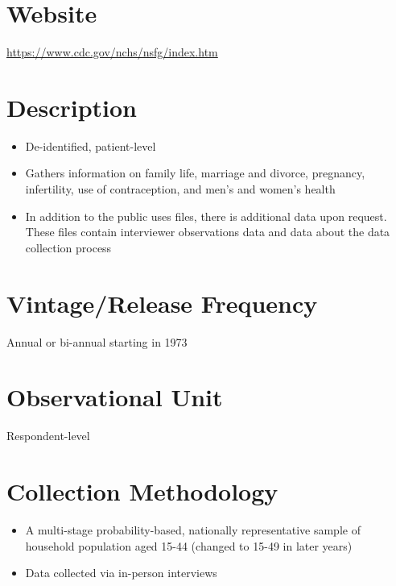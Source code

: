 \documentclass[
]{book}
\providecommand{\tightlist}{%
  \setlength{\itemsep}{0pt}\setlength{\parskip}{0pt}}
\begin{document}
\hypertarget{website-63}{%
\section{Website}\label{website-63}}

\url{https://www.cdc.gov/nchs/nsfg/index.htm}

\hypertarget{description-63}{%
\section{Description}\label{description-63}}

\begin{itemize}
\tightlist
\item
  De-identified, patient-level
\item
  Gathers information on family life, marriage and divorce, pregnancy, infertility, use of contraception, and men's and women's health
\item
  In addition to the public uses files, there is additional data upon request. These files contain interviewer observations data and data about the data collection process
\end{itemize}

\hypertarget{vintagerelease-frequency-63}{%
\section{Vintage/Release Frequency}\label{vintagerelease-frequency-63}}

Annual or bi-annual starting in 1973

\hypertarget{observational-unit-63}{%
\section{Observational Unit}\label{observational-unit-63}}

Respondent-level

\hypertarget{collection-methodology-63}{%
\section{Collection Methodology}\label{collection-methodology-63}}

\begin{itemize}
\tightlist
\item
  A multi-stage probability-based, nationally representative sample of household population aged 15-44 (changed to 15-49 in later years)
\item
  Data collected via in-person interviews
\end{itemize}
\end{document}
